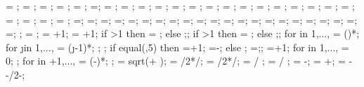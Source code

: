 {{\starty = \starty;
\supportwidth = \supportwidth;
\supportheight = \supportheight;
\isolationwidth = \isolationwidth;
\isolationdepth = \isolationdepth;
\isoshift=\isoshift;
\foundationdepth = \foundationdepth;
\linet = \linet;
\beamlinet = \beamlinet;
\collinet = \collinet;
\baselinet = \baselinet;
\isolinet = \isolinet;
\massrad = \massrad;
\foundsidew = \foundsidew;
\leftsoildist = \leftsoildist;
\rightsoildist = \rightsoildist;
\leftsoildepth = \leftsoildepth;
\rightsoildepth = \rightsoildepth;
\soilbelowfound = \soilbelowfound;
\leftcontrolx = \leftcontrolx;
\leftcontroly = \leftcontroly;
\rightcontrolx = \rightcontrolx;
\rightcontroly = \rightcontroly;
\axeslenX = \axeslenX;
\axeslenY = \axeslenY;
\piledepth=\piledepth;
\pilesidespace=\pilesidespace;
\pilediameter=\pilediameter;
\pilelinethickness=\pilelinethickness;
\pblinet=\pblinet;
\latloadshift=\latloadshift;
\toparrlen=\toparrlen;
\basearrlen=\basearrlen;
\drift=\drift;
=;
=;
=;
\engbedrockdepth=\engbedrockdepth;
\engbedrockleftdist=\engbedrockleftdist;
\engbedrockrightdist=\engbedrockrightdist;
\engbedrocklinewidth=\engbedrocklinewidth;
\translayerlinet=\translayerlinet;
\ssinterlinet=\ssinterlinet;
\markssexspace=\markssexspace;
\markssrad=\markssrad;
\marksslinet=\marksslinet;
\supershadespace=\supershadespace;
;
\storyminone = ;
\columnnumber = \baynumber+1; %
\levelnumber = \storynumber+1; %
if \storynumber>1 then {\nlevmo = ;} else {;};
if \baynumber>1 then {\ncolmo = ;} else {;};
for \iii in {1,...,{\levelnumber}}{
\y{\iii} = ()*\storyheight;
for \j in {1,...,{\columnnumber}}{
\x{\j} = (\j-1)*\baywidth;
};
};
if equal(\showsupports,5) then
{=\subfloors+1;
\superstorynumber=\storynumber-\subfloors;}
else
{;
\superstorynumber=\storynumber;};
=+1;
for \idefl in {1,...,{}}{
	 = 0;
};
for \idefl in {+1,...,{\levelnumber}}{
	 = (\idefl-)*\drift;
};
\tempdim = sqrt( + );
\fixbeamx = \collinet/2*/\tempdim;
\fixbeamy = \collinet/2*/\tempdim;
 =  / \storyheight * \baywidth;
 =  / \storyheight * \baywidth;
\rigbasestartx = -\supportwidth;
\rigbaseendx = \x{\columnnumber}+\supportwidth;
\isoboty = -\supportheight-\baselinet/2-\isolationdepth;
}}
